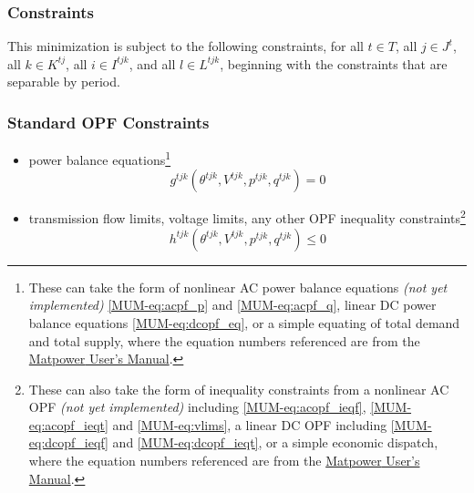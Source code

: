 \documentclass[12pt]{article}
\newcommand{\mpver}[0]{7.1}
\newcommand{\matpower}[0]{{\sc Matpower}}
\newcommand{\mumurl}[0]{https://matpower.org/docs/MATPOWER-manual-\mpver.pdf}
\newcommand{\mum}[0]{\href{\mumurl}{\matpower{} User's Manual}}
\numberwithin{equation}{section}
\numberwithin{table}{section}
\numberwithin{figure}{section}
\begin{document}
\subsubsection{Constraints}

This minimization is subject to the following constraints, for all $t \in T$, all $j \in J^t$, all $k \in K^{tj}$, all $i \in I^{tjk}$, and all $l \in L^{tjk}$, beginning with the constraints that are separable by period.

\subsubsection*{Standard OPF Constraints}

\begin{itemize}
\item[--] power balance equations\footnote{These can take the form of nonlinear AC power balance equations \emph{(not yet implemented)} \eqref{MUM-eq:acpf_p} and \eqref{MUM-eq:acpf_q}, linear DC power balance equations \eqref{MUM-eq:dcopf_eq}, or a simple equating of total demand and total supply, where the equation numbers referenced are from the \mum{}.}
\begin{equation}
  g^{tjk}(\theta^{tjk},V^{tjk},p^{tjk},q^{tjk}) = 0 \label{eq:firstopf}
\end{equation}
\item[--] transmission flow limits, voltage limits, any other OPF inequality constraints\footnote{These can also take the form of inequality constraints from a nonlinear AC OPF \emph{(not yet implemented)} including \eqref{MUM-eq:acopf_ieqf}, \eqref{MUM-eq:acopf_ieqt} and \eqref{MUM-eq:vlims}, a linear DC OPF including \eqref{MUM-eq:dcopf_ieqf} and \eqref{MUM-eq:dcopf_ieqt}, or a simple economic dispatch, where the equation numbers referenced are from the \mum{}.}
\begin{equation}
  h^{tjk}(\theta^{tjk},V^{tjk},p^{tjk},q^{tjk}) \leq 0
\end{equation}
\end{itemize}
\end{document}
